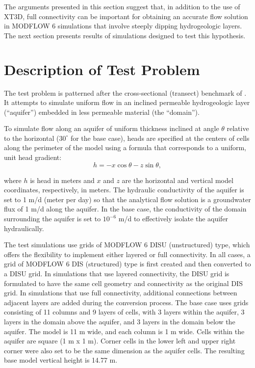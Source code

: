 \documentclass{article}
\begin{document}
The arguments presented in this section suggest that, in addition to the use of XT3D, full connectivity can be important for obtaining an accurate flow solution in MODFLOW 6 simulations that involve steeply dipping hydrogeologic layers. The next section presents results of simulations designed to test this hypothesis.

\section*{Description of Test Problem}

The test problem is patterned after the cross-sectional (transect) benchmark of \cite{bardot2023}. It attempts to simulate uniform flow in an inclined permeable hydrogeologic layer (``aquifer'') embedded in less permeable material (the ``domain'').

To simulate flow along an aquifer of uniform thickness inclined at angle $\theta$ relative to the horizontal ($30^{\circ}$ for the base case), heads are specified at the centers of cells along the perimeter of the model using a formula that corresponds to a uniform, unit head gradient:
\begin{equation}
\label{eqn:head_analyt_along}
h = - x \cos \theta - z \sin \theta,
\end{equation}

\noindent where $h$ is head in meters and $x$ and $z$ are the horizontal and vertical model coordinates, respectively, in meters. The hydraulic conductivity of the aquifer is set to 1 m/d (meter per day) so that the analytical flow solution is a groundwater flux of 1 m/d along the aquifer. In the base case, the conductivity of the domain surrounding the aquifer is set to $10^{-6}$ m/d to effectively isolate the aquifer hydraulically.

The test simulations use grids of MODFLOW 6 DISU (unstructured) type, which offers the flexibility to implement either layered or full connectivity. In all cases, a grid of MODFLOW 6 DIS (structured) type is first created and then converted to a DISU grid. In simulations that use layered connectivity, the DISU grid is formulated to have the same cell geometry and connectivity as the original DIS grid. In simulations that use full connectivity, additional connections between adjacent layers are added during the conversion process. The base case uses grids consisting of 11 columns and 9 layers of cells, with 3 layers within the aquifer, 3 layers in the domain above the aquifer, and 3 layers in the domain below the aquifer.  The model is 11 m wide, and each column is 1 m wide. Cells within the aquifer are square (1 m x 1 m). Corner cells in the lower left and upper right corner were also set to be the same dimension as the aquifer cells. The resulting base model vertical height is 14.77 m.  
\end{document}
